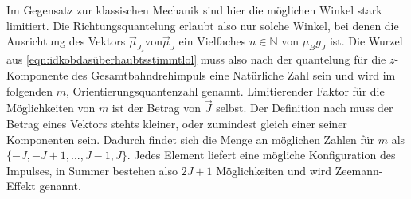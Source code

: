 Im Gegensatz zur klassischen Mechanik sind hier die möglichen Winkel stark limitiert. Die Richtungsquantelung erlaubt also nur solche Winkel, 
bei denen die Ausrichtung des Vektors $\vec{\mu}_{J_z} \text{von}  \vec{\mu}_J$ ein Vielfaches $n \in \mathbb{N} $ von $\mu_B g_J$ ist. 
Die Wurzel aus \eqref{eqn:idkobdasüberhaubtsstimmtlol} muss also nach der quantelung für die $z$-Komponente des Gesamtbahndrehimpuls
eine Natürliche Zahl sein und wird im folgenden $m$, Orientierungsquantenzahl genannt.
Limitierender Faktor für die Möglichkeiten von $m$ ist der Betrag von $\vec{J}$ selbst. Der Definition nach muss der 
Betrag eines Vektors stehts kleiner, oder zumindest gleich einer seiner Komponenten sein. Dadurch findet sich die Menge an 
möglichen Zahlen für $m$ als $\{-J,-J+1,...,J-1,J\}$. Jedes Element liefert eine mögliche Konfiguration des Impulses, in Summer 
bestehen also $2J+1$ Möglichkeiten und wird Zeemann-Effekt genannt. 